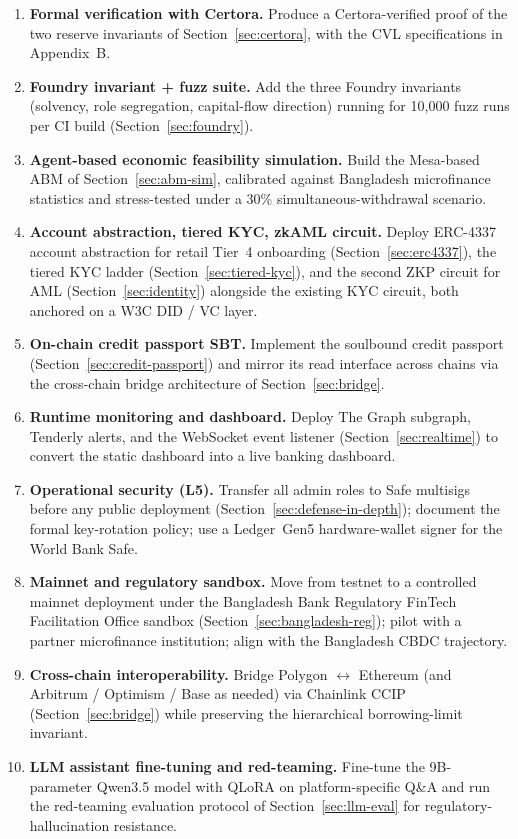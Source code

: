 \documentclass[12pt,a4paper]{report}
\begin{document}
\begin{enumerate}[noitemsep]
\item \textbf{Formal verification with Certora.} Produce a Certora-verified proof of the two reserve invariants of Section~\ref{sec:certora}, with the CVL specifications in Appendix~B.
\item \textbf{Foundry invariant + fuzz suite.} Add the three Foundry invariants (solvency, role segregation, capital-flow direction) running for 10{,}000 fuzz runs per CI build (Section~\ref{sec:foundry}).
\item \textbf{Agent-based economic feasibility simulation.} Build the Mesa-based ABM of Section~\ref{sec:abm-sim}, calibrated against Bangladesh microfinance statistics and stress-tested under a 30\% simultaneous-withdrawal scenario.
\item \textbf{Account abstraction, tiered KYC, zkAML circuit.} Deploy ERC-4337 account abstraction for retail Tier~4 onboarding (Section~\ref{sec:erc4337}), the tiered KYC ladder (Section~\ref{sec:tiered-kyc}), and the second ZKP circuit for AML (Section~\ref{sec:identity}) alongside the existing KYC circuit, both anchored on a W3C DID / VC layer.
\item \textbf{On-chain credit passport SBT.} Implement the soulbound credit passport (Section~\ref{sec:credit-passport}) and mirror its read interface across chains via the cross-chain bridge architecture of Section~\ref{sec:bridge}.
\item \textbf{Runtime monitoring and dashboard.} Deploy The Graph subgraph, Tenderly alerts, and the WebSocket event listener (Section~\ref{sec:realtime}) to convert the static dashboard into a live banking dashboard.
\item \textbf{Operational security (L5).} Transfer all admin roles to Safe multisigs before any public deployment (Section~\ref{sec:defense-in-depth}); document the formal key-rotation policy; use a Ledger~Gen5 hardware-wallet signer for the World Bank Safe.
\item \textbf{Mainnet and regulatory sandbox.} Move from testnet to a controlled mainnet deployment under the Bangladesh Bank Regulatory FinTech Facilitation Office sandbox (Section~\ref{sec:bangladesh-reg}); pilot with a partner microfinance institution; align with the Bangladesh CBDC trajectory.
\item \textbf{Cross-chain interoperability.} Bridge Polygon $\leftrightarrow$ Ethereum (and Arbitrum / Optimism / Base as needed) via Chainlink CCIP (Section~\ref{sec:bridge}) while preserving the hierarchical borrowing-limit invariant.
\item \textbf{LLM assistant fine-tuning and red-teaming.} Fine-tune the 9B-parameter Qwen3.5 model with QLoRA on platform-specific Q\&A and run the red-teaming evaluation protocol of Section~\ref{sec:llm-eval} for regulatory-hallucination resistance.
\end{enumerate}
\end{document}
